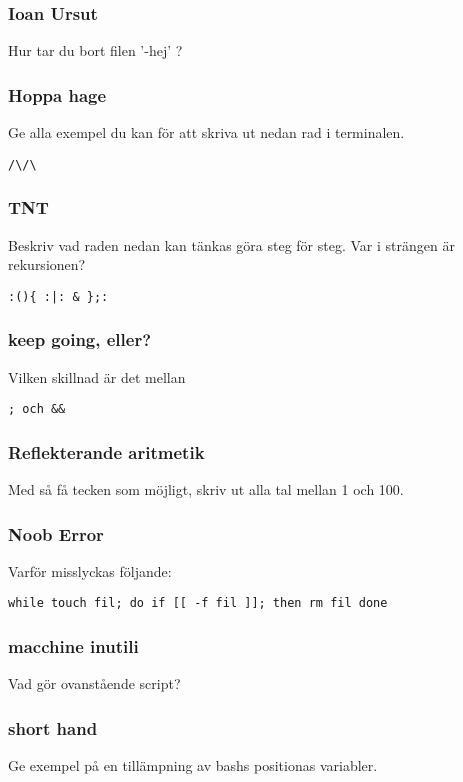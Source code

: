 \documentclass[a4paper]{report}
\begin{document}
\subsubsection{Ioan Ursut}
Hur tar du bort filen '-hej' ?

\subsubsection{Hoppa hage}
Ge alla exempel du kan för att skriva ut nedan rad i terminalen.
\begin{verbatim}
/\/\
\end{verbatim}

\subsubsection{TNT}
Beskriv vad raden nedan kan tänkas göra steg för steg. Var i strängen är rekursionen?

\begin{verbatim}
:(){ :|: & };:
\end{verbatim}

\subsubsection{keep going, eller?}
Vilken skillnad är det mellan
\begin{verbatim}
; och &&
\end{verbatim}

\subsubsection{Reflekterande aritmetik}
Med så få tecken som möjligt, skriv ut alla tal mellan 1 och 100.

\subsubsection{Noob Error}
Varför misslyckas följande:

\begin{verbatim}
while touch fil; do if [[ -f fil ]]; then rm fil done
\end{verbatim}

\subsubsection{macchine inutili}
Vad gör ovanstående script?

\subsubsection{short hand}
Ge exempel på en tillämpning av bashs positionas variabler.
\end{document}

